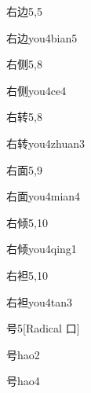 \begin{entry}{右边}{5,5}
  \begin{phonetics}{右边}{you4bian5}
  \end{phonetics}
\end{entry}

\begin{entry}{右侧}{5,8}
  \begin{phonetics}{右侧}{you4ce4}
  \end{phonetics}
\end{entry}

\begin{entry}{右转}{5,8}
  \begin{phonetics}{右转}{you4zhuan3}
  \end{phonetics}
\end{entry}

\begin{entry}{右面}{5,9}
  \begin{phonetics}{右面}{you4mian4}
  \end{phonetics}
\end{entry}

\begin{entry}{右倾}{5,10}
  \begin{phonetics}{右倾}{you4qing1}
  \end{phonetics}
\end{entry}

\begin{entry}{右袒}{5,10}
  \begin{phonetics}{右袒}{you4tan3}
  \end{phonetics}
\end{entry}

\begin{entry}{号}{5}[Radical 口]
  \begin{phonetics}{号}{hao2}
  \end{phonetics}
  \begin{phonetics}{号}{hao4}
  \end{phonetics}
\end{entry}

